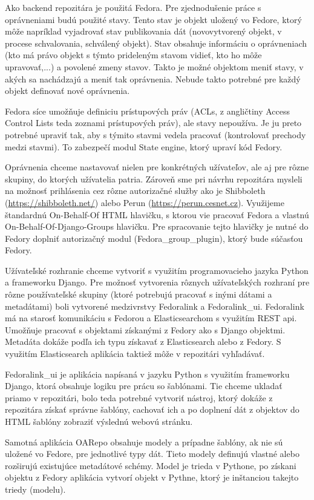 \documentclass[thesis=M,slovak]{FITthesis}[2013/05/06]
\begin{document}
Ako backend repozitára je použitá Fedora. Pre zjednodušenie práce s oprávneniami budú použité stavy. Tento stav je objekt uložený vo Fedore, ktorý môže napríklad vyjadrovať stav publikovania dát (novovytvorený objekt, v procese schvalovania, schválený objekt). Stav obsahuje informáciu o oprávneniach (kto má právo objekt s týmto prideleným stavom vidieť, kto ho môže upravovať,...) a povolené zmeny stavov. Takto je možné objektom meniť stavy, v akých sa nachádzajú a meniť tak oprávnenia. Nebude takto potrebné pre každý objekt definovať nové oprávnenia.

Fedora síce umožňuje definiciu prístupových práv (ACLs, z angličtiny Access Control Lists teda zoznami prístupových práv), ale stavy nepoužíva. Je ju preto potrebné upraviť tak, aby s týmito stavmi vedela pracovať (kontrolovať prechody medzi stavmi). To zabezpečí modul State engine, ktorý upraví kód Fedory.

Oprávnenia chceme nastavovať nielen pre konkrétných užívateľov, ale aj pre rôzne skupiny, do ktorých užívatelia patria. Zároveň sme pri návrhu repozitára mysleli na možnosť prihlásenia cez rôzne autorizačné služby ako je Shibboleth (\url{https://shibboleth.net/}) alebo Perun (\url{https://perun.cesnet.cz}). Využijeme štandardnú On-Behalf-Of HTML hlavičku, s ktorou vie pracovať Fedora a vlastnú On-Behalf-Of-Django-Groups hlavičku. Pre spracovanie tejto hlavičky je nutné do Fedory doplniť autorizačný modul (Fedora\_group\_plugin), ktorý bude súčasťou Fedory.

Užívateľské rozhranie chceme vytvoriť s využitím programovacieho jazyka Python a frameworku Django. Pre možnosť vytvorenia rôznych užívateľských rozhraní pre rôzne používateľské skupiny (ktoré potrebujú pracovať s inými dátami a metadátami) boli vytvorené medzivrstvy Fedoralink a Fedoralink\_ui. Fedoralink má na starosť komunikáciu s Fedorou a Elasticsearchom s využitím REST api. Umožňuje pracovať s objektami získanými z Fedory ako s Django objektmi. Metadáta dokáže podľa ich typu získavať z Elasticsearch alebo z Fedory. S využitím Elasticsearch aplikácia taktiež môže v repozitári vyhľadávať.

Fedoralink\_ui je aplikácia napísaná v jazyku Python s využitím frameworku Django, ktorá obsahuje logiku pre prácu so šablónami. Tie chceme ukladať priamo v repozitári, bolo teda potrebné vytvoriť nástroj, ktorý dokáže z repozitára získať správne šablóny, cachovať ich a po doplnení dát z objektov do HTML šablóny zobraziť výslednú webovú stránku.

Samotná aplikácia OARepo obsahuje modely a prípadne šablóny, ak nie sú uložené vo Fedore, pre jednotlivé typy dát. Tieto modely definujú vlastné alebo rozširujú existujúce metadátové schémy. Model je trieda v Pythone, po získani objektu z Fedory aplikácia vytvorí objekt v Pythne, ktorý je inštanciou takejto triedy (modelu).
\end{document}

